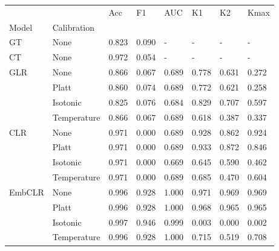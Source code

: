 \begin{tabular}{llllllll}
\toprule
 &  & Acc & F1 & AUC & K1 & K2 & Kmax \\
Model & Calibration &  &  &  &  &  &  \\
\midrule
GT & None & 0.823 & 0.090 & - & - & - & - \\
\cline{1-8}
CT & None & 0.972 & 0.054 & - & - & - & - \\
\cline{1-8}
\multirow[t]{4}{*}{GLR} & None & 0.866 & 0.067 & 0.689 & 0.778 & 0.631 & 0.272 \\
 & Platt & 0.860 & 0.074 & 0.689 & 0.772 & 0.621 & 0.258 \\
 & Isotonic & 0.825 & 0.076 & 0.684 & 0.829 & 0.707 & 0.597 \\
 & Temperature & 0.866 & 0.067 & 0.689 & 0.618 & 0.387 & 0.337 \\
\cline{1-8}
\multirow[t]{4}{*}{CLR} & None & 0.971 & 0.000 & 0.689 & 0.928 & 0.862 & 0.924 \\
 & Platt & 0.971 & 0.000 & 0.689 & 0.933 & 0.872 & 0.846 \\
 & Isotonic & 0.971 & 0.000 & 0.669 & 0.645 & 0.590 & 0.462 \\
 & Temperature & 0.971 & 0.000 & 0.689 & 0.685 & 0.470 & 0.604 \\
\cline{1-8}
\multirow[t]{4}{*}{EmbCLR} & None & 0.996 & 0.928 & 1.000 & 0.971 & 0.969 & 0.969 \\
 & Platt & 0.996 & 0.928 & 1.000 & 0.968 & 0.965 & 0.965 \\
 & Isotonic & 0.997 & 0.946 & 0.999 & 0.003 & 0.000 & 0.002 \\
 & Temperature & 0.996 & 0.928 & 1.000 & 0.715 & 0.519 & 0.708 \\
\cline{1-8}
\bottomrule
\end{tabular}
